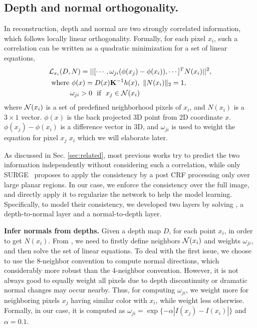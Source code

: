 \vspace{-0\baselineskip}
\subsection{Depth and normal orthogonality.}
\label{sub:depth_and_normal_orthogonality}
\vspace{-0\baselineskip}

In reconstruction, depth and normal are two strongly correlated information, which follows locally linear orthogonality. Formally, for each pixel $x_i$, such a correlation can be written as a quadratic minimization for a set of linear equations,
\begin{align}
\label{eq:orthognal}
&{\mathcal L}_{x_i}(D, N) = ||[\cdots,\omega_{ji}(\phi(x_j) - \phi(x_i)), \cdots]^T  N(x_i)||^2, \nonumber \\
&~\text{where~} \phi(x) = D(x){\mathbf K}^{-1}h(x), \text{~} \|N(x_i)\|_2 = 1, \nonumber\\
&~\text{~~~~~~~~} \omega_{ji} > 0 \text{~~if~~} x_j \in {\mathcal N}(x_i)
\end{align}
where ${\mathcal N}(x_i)$ is a set of predefined neighborhood pixels of $x_i$, and $N(x_i)$ is a $3 \times 1$ vector. $\phi(x)$ is the back projected 3D point from 2D coordinate $x$. $\phi(x_j) - \phi(x_i)$ is a difference vector in 3D, and $\omega_{ji}$ is used to weight the equation for pixel $x_j$ \wrt $x_i$ which we will elaborate later.

As discussed in Sec. \ref{sec:related}, most previous works try to predict the two information independently without considering such a correlation, while only SURGE~\cite{peng2016depth} proposes to apply the consistency by a post CRF processing only over large planar regions. In our case, we enforce the consistency over the full image, and directly apply it to regularize the network to help the model learning. Specifically, to model their consistency, we developed two layers by solving , \ie a depth-to-normal layer and a normal-to-depth layer. 

\textbf{Infer normals from depths.} 
\label{chap:d2n}
Given a depth map $D$, for each point $x_i$, in order to get $N(x_i)$. From , we need to firstly define neighbors ${\mathcal N}(x_i)$ and weights $\omega_{ji}$, and then solve the set of linear equations. To deal with the first issue, we choose to use the 8-neighbor convention to compute normal directions, which considerably more robust than the 4-neighbor convention. 
However, it is not always good to equally weight all pixels due to depth discontinuity or dramatic normal changes may occur nearby. Thus, for computing $\omega_{ji}$, we weight more for neighboring pixels $x_j$ having similar color with $x_i$, while weight less otherwise. Formally, in our case, it is computed as $\omega_{ji} = \exp\{-\alpha|I(x_j) - I(x_i)|\}$ and $\alpha = 0.1$. 

